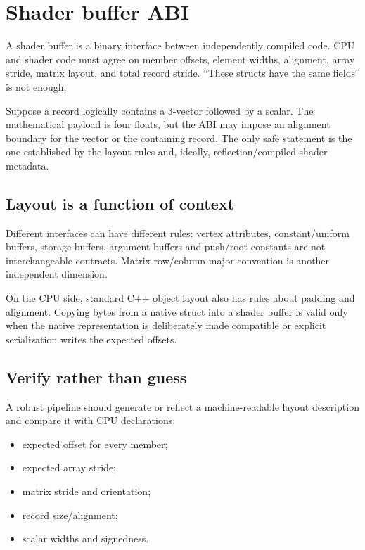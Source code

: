\hypertarget{appendix-749048795dbb}{}
\section{Shader buffer ABI}\label{appendix-749048795dbb-shader-buffer-abi}

A shader buffer is a binary interface between independently compiled code. CPU and shader code must agree on member offsets, element widths, alignment, array stride, matrix layout, and total record stride. ``These structs have the same fields'' is not enough.

Suppose a record logically contains a 3-vector followed by a scalar. The mathematical payload is four floats, but the ABI may impose an alignment boundary for the vector or the containing record. The only safe statement is the one established by the layout rules and, ideally, reflection/compiled shader metadata.

\subsection{Layout is a function of context}\label{appendix-749048795dbb-layout-is-a-function-of-context}

Different interfaces can have different rules: vertex attributes, constant/uniform buffers, storage buffers, argument buffers and push/root constants are not interchangeable contracts. Matrix row/column-major convention is another independent dimension.

On the CPU side, standard C++ object layout also has rules about padding and alignment. Copying bytes from a native struct into a shader buffer is valid only when the native representation is deliberately made compatible or explicit serialization writes the expected offsets.

\subsection{Verify rather than guess}\label{appendix-749048795dbb-verify-rather-than-guess}

A robust pipeline should generate or reflect a machine-readable layout description and compare it with CPU declarations:

\begin{itemize}
\tightlist
\item
  expected offset for every member;
\item
  expected array stride;
\item
  matrix stride and orientation;
\item
  record size/alignment;
\item
  scalar widths and signedness.
\end{itemize}

